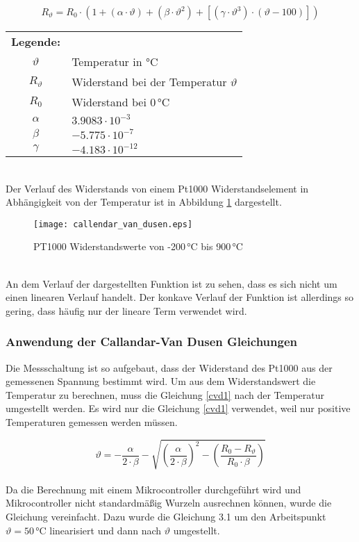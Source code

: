 \begin{equation}
	R_\vartheta = R_0 \cdot (1 + (\alpha \cdot \vartheta) 
	+ (\beta \cdot \vartheta^2)
	+ [(\gamma \cdot \vartheta^3) \cdot (\vartheta - 100)])
	\label{cvd2}
\end{equation}

\vspace{12pt}
\begin{tabular}{c l}
	\textbf{Legende:}\\
	\(\vartheta\) & Temperatur in °C\\
	\(R_\vartheta\) & Widerstand bei der Temperatur \(\vartheta\)\\
	\(R_0\) & Widerstand bei 0\,°C\\
	\(\alpha\) & \(3.9083 \cdot 10^{-3}\)\\
	\(\beta\) & \(-5.775 \cdot 10^{-7}\)\\
	\(\gamma\) & \(-4.183 \cdot 10^{-12}\)\\
\end{tabular}
\vspace{24pt}
\\
\noindent
Der Verlauf des Widerstands von einem Pt1000 Widerstandselement in Abhängigkeit von der Temperatur ist in Abbildung \ref{cvd_graph} dargestellt. 
\\
\vspace{10pt}
\begin{figure}[h]
\centering
\texttt{[image: callendar\_van\_dusen.eps]}
\caption{PT1000 Widerstandswerte von -200\,°C bis 900\,°C}
\label{cvd_graph}
\end{figure}
\\
\noindent
An dem Verlauf der dargestellten Funktion ist zu sehen, dass es sich nicht um einen linearen Verlauf handelt. Der konkave Verlauf der Funktion ist allerdings so gering, dass häufig nur der lineare Term verwendet wird.

\subsubsection{Anwendung der Callandar-Van Dusen Gleichungen}
Die Messschaltung ist so aufgebaut, dass der Widerstand des Pt1000 aus der gemessenen Spannung bestimmt wird. Um aus dem Widerstandswert die Temperatur zu berechnen, muss die Gleichung \ref{cvd1} nach der Temperatur umgestellt werden. Es wird nur die Gleichung \ref{cvd1} verwendet, weil nur positive Temperaturen gemessen werden müssen.

\vspace{12pt}
\begin{equation}
	\vartheta = -\frac{\alpha}{2 \cdot \beta}
				-\sqrt{\left(\frac{\alpha}{2 \cdot \beta}\right)^2
				- \left(\frac{R_0 - R_\vartheta}{R_0 \cdot \beta}\right)}
\end{equation}
\vspace{12pt}
\\
\noindent
Da die Berechnung mit einem Mikrocontroller durchgeführt wird und Mikrocontroller nicht standardmäßig Wurzeln ausrechnen können, wurde die Gleichung vereinfacht. Dazu wurde die Gleichung 3.1 um den Arbeitspunkt \(\vartheta = 50\)\,°C linearisiert und dann nach \(\vartheta\) umgestellt.

